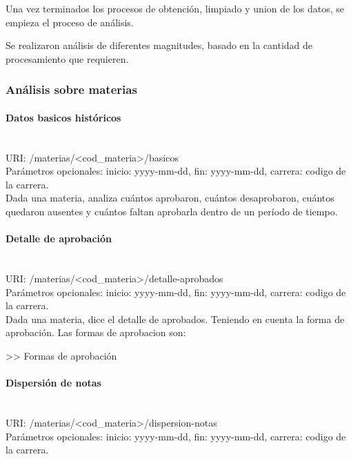 Una vez terminados los procesos de obtención, limpiado y union de los datos, se empieza el proceso de análisis.

Se realizaron análisis de diferentes magnitudes, basado en la cantidad de procesamiento que requieren. 
\subsubsection{Análisis sobre materias}

\paragraph{Datos basicos históricos} \mbox{}\\

URI: /materias/<cod\_materia>/basicos \\

Parámetros opcionales: inicio: yyyy-mm-dd, fin: yyyy-mm-dd, carrera: codigo de la carrera. \\

Dada una materia, analiza cuántos aprobaron, cuántos desaprobaron, cuántos quedaron ausentes y cuántos faltan aprobarla dentro de un período de tiempo.

\paragraph{Detalle de aprobación}\mbox{}\\

URI: /materias/<cod\_materia>/detalle-aprobados \\

Parámetros opcionales: inicio: yyyy-mm-dd, fin: yyyy-mm-dd, carrera: codigo de la carrera. \\

Dada una materia, dice el detalle de aprobados. Teniendo en cuenta la forma de aprobación. Las formas de aprobacion son:

>> Formas de aprobación

\paragraph{Dispersión de notas}\mbox{}\\

URI: /materias/<cod\_materia>/dispersion-notas \\

Parámetros opcionales: inicio: yyyy-mm-dd, fin: yyyy-mm-dd, carrera: codigo de la carrera. \\

